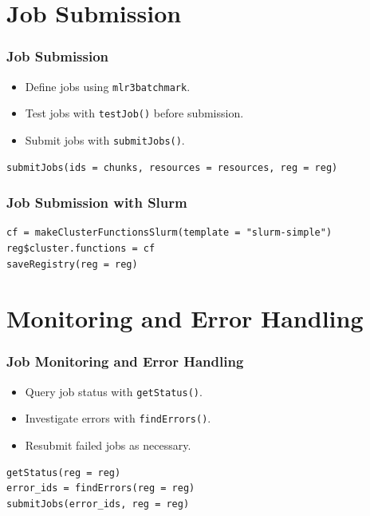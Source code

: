 \documentclass{beamer}
\begin{document}
\section{Job Submission}
\begin{frame}[fragile]
\frametitle{Job Submission}
\begin{itemize}
    \item Define jobs using \texttt{mlr3batchmark}.
    \item Test jobs with \texttt{testJob()} before submission.
    \item Submit jobs with \texttt{submitJobs()}.
\end{itemize}
\begin{verbatim}
submitJobs(ids = chunks, resources = resources, reg = reg)
\end{verbatim}
\end{frame}

\begin{frame}[fragile]
\frametitle{Job Submission with Slurm}
\begin{verbatim}
cf = makeClusterFunctionsSlurm(template = "slurm-simple")
reg$cluster.functions = cf
saveRegistry(reg = reg)
\end{verbatim}
\end{frame}

\section{Monitoring and Error Handling}
\begin{frame}[fragile]
\frametitle{Job Monitoring and Error Handling}
\begin{itemize}
    \item Query job status with \texttt{getStatus()}.
    \item Investigate errors with \texttt{findErrors()}.
    \item Resubmit failed jobs as necessary.
\end{itemize}
\begin{verbatim}
getStatus(reg = reg)
error_ids = findErrors(reg = reg)
submitJobs(error_ids, reg = reg)
\end{verbatim}
\end{frame}
\end{document}
